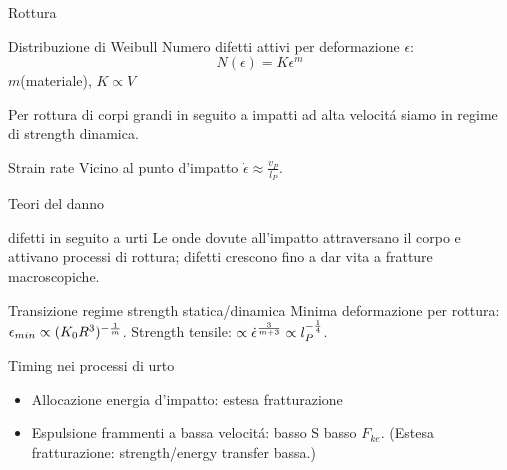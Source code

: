 \begin{frame}{Rottura}
\begin{block}{Distribuzione di Weibull}
Numero difetti attivi per deformazione $\epsilon$:
\begin{equation*}
N(\epsilon)=K\epsilon^m
\end{equation*}
$m$(materiale), $K\propto V$
\end{block}
Per rottura di corpi grandi in seguito a impatti ad alta velocit\'a siamo in regime di strength dinamica.
\begin{block}{Strain rate}
Vicino al punto d'impatto $\dot{\epsilon}\approx\frac{v_P}{l_P}$.
\end{block}
\end{frame}

\begin{wordonframe}{Teori del danno}
\begin{block}{difetti in seguito a urti}
Le onde dovute all'impatto attraversano il corpo e attivano processi di rottura; difetti crescono fino a dar vita a fratture macroscopiche.
\end{block}
\begin{block}{Transizione regime strength statica/dinamica}
Minima deformazione per rottura: $\epsilon_{min}\propto(K_0R^3)^{-\frac{1}{m}}$.
Strength tensile: $\propto\dot{\epsilon}^{\frac{3}{m+3}}\propto l_P^{-\frac{1}{4}}$.
\end{block}
\end{wordonframe}

\begin{frame}{Timing nei processi di urto}
\begin{itemize}
\item Allocazione energia d'impatto: estesa fratturazione
\item Espulsione frammenti a bassa velocit\'a: basso S basso $F_{ke}$. (Estesa fratturazione: strength/energy transfer bassa.)
\end{itemize}
\end{frame}

